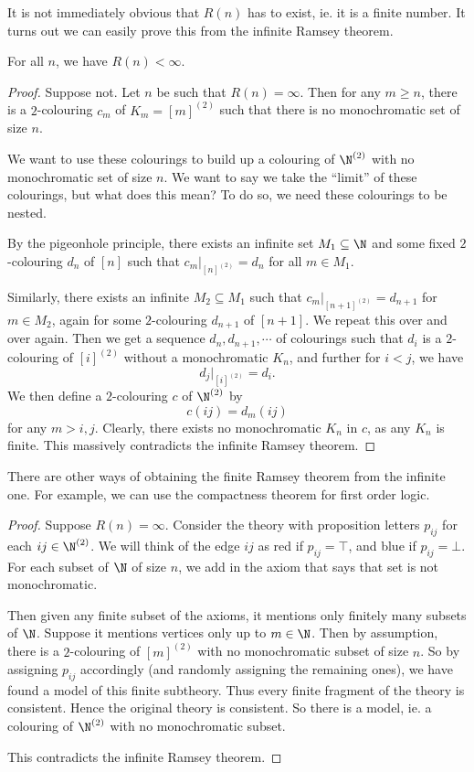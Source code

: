 \documentclass[a4paper]{article}
\begin{document}
It is not immediately obvious that $R(n)$ has to exist, ie. it is a finite number. It turns out we can easily prove this from the infinite Ramsey theorem.
\begin{thm}
  For all $n$, we have $R(n) < \infty$.
\end{thm}

\begin{proof}
  Suppose not. Let $n$ be such that $R(n) = \infty$. Then for any $m \geq n$, there is a $2$-colouring $c_m$ of $K_m = [m]^{(2)}$ such that there is no monochromatic set of size $n$.

  We want to use these colourings to build up a colouring of $\N^{(2)}$ with no monochromatic set of size $n$. We want to say we take the ``limit'' of these colourings, but what does this mean? To do so, we need these colourings to be nested.

  By the pigeonhole principle, there exists an infinite set $M_1 \subseteq \N$ and some fixed $2$-colouring $d_n$ of $[n]$ such that $c_m|_{[n]^{(2)}} = d_n$ for all $m \in M_1$.

  Similarly, there exists an infinite $M_2 \subseteq M_1$ such that $c_m|_{[n + 1]^{(2)}} = d_{n + 1}$ for $m \in M_2$, again for some $2$-colouring $d_{n + 1}$ of $[n + 1]$. We repeat this over and over again. Then we get a sequence $d_n, d_{n + 1}, \cdots$ of colourings such that $d_i$ is a $2$-colouring of $[i]^{(2)}$ without a monochromatic $K_n$, and further for $i < j$, we have
  \[
    d_j|_{[i]^{(2)}} = d_i.
  \]
  We then define a $2$-colouring $c$ of $\N^{(2)}$ by
  \[
    c(ij) = d_m(ij)
  \]
  for any $m > i, j$. Clearly, there exists no monochromatic $K_n$ in $c$, as any $K_n$ is finite. This massively contradicts the infinite Ramsey theorem.
\end{proof}

There are other ways of obtaining the finite Ramsey theorem from the infinite one. For example, we can use the compactness theorem for first order logic.
\begin{proof}
  Suppose $R(n) = \infty$. Consider the theory with proposition letters $p_{ij}$ for each $ij \in \N^{(2)}$. We will think of the edge $ij$ as red if $p_{ij} = \top$, and blue if $p_{ij} = \bot$. For each subset of $\N$ of size $n$, we add in the axiom that says that set is not monochromatic.

  Then given any finite subset of the axioms, it mentions only finitely many subsets of $\N$. Suppose it mentions vertices only up to $m \in \N$. Then by assumption, there is a $2$-colouring of $[m]^{(2)}$ with no monochromatic subset of size $n$. So by assigning $p_{ij}$ accordingly (and randomly assigning the remaining ones), we have found a model of this finite subtheory. Thus every finite fragment of the theory is consistent. Hence the original theory is consistent. So there is a model, ie. a colouring of $\N^{(2)}$ with no monochromatic subset.

  This contradicts the infinite Ramsey theorem.
\end{proof}
\end{document}
